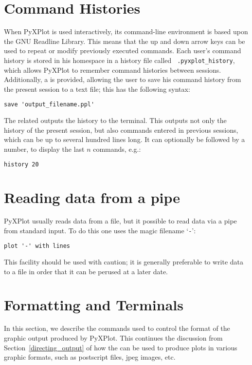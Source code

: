 \section{Command Histories}

When PyXPlot is used interactively, its command-line environment is based upon
the GNU Readline Library.  This means that the up and down arrow keys can be
used to repeat or modify previously executed commands. Each user's command
history is stored in his homespace in a history file called {\tt
.pyxplot\_history}, which allows PyXPlot to remember command histories between
sessions. Additionally, a  is provided, allowing the user to save
his command history from the present session to a text file; this has the
following syntax:

\begin{verbatim}
save 'output_filename.ppl'
\end{verbatim}

The related  outputs the history to the terminal. This outputs
not only the history of the present session, but also commands entered in
previous sessions, which can be up to several hundred lines long. It can
optionally be followed by a number, to display the last $n$ commands, e.g.:

\begin{verbatim}
history 20
\end{verbatim}

\section{Reading data from a pipe}

PyXPlot usually reads data from a file, but it possible to read data via a pipe
from standard input.  To do this one uses the magic filename `{\tt -}':

\begin{verbatim}
plot '-' with lines
\end{verbatim}

This facility should be used with caution; it is generally preferable to write
data to a file in order that it can be perused at a later date.

\section{Formatting and Terminals}
\label{set_terminal2}

In this section, we describe the commands used to control the format of the
graphic output produced by PyXPlot. This continues the discussion from
Section~\ref{directing_output} of how the  can be used to
produce plots in various graphic formats, such as postscript files, jpeg
images, etc.

